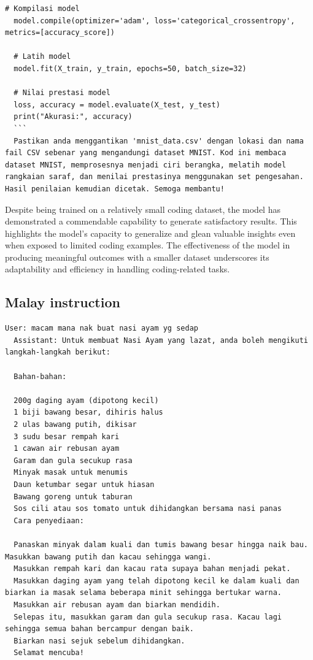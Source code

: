 \documentclass[preprint]{article}
\begin{document}
\begin{lstlisting}[breaklines=true]
  # Kompilasi model
  model.compile(optimizer='adam', loss='categorical_crossentropy', metrics=[accuracy_score])
  
  # Latih model
  model.fit(X_train, y_train, epochs=50, batch_size=32)
  
  # Nilai prestasi model
  loss, accuracy = model.evaluate(X_test, y_test)
  print("Akurasi:", accuracy)
  ```
  Pastikan anda menggantikan 'mnist_data.csv' dengan lokasi dan nama fail CSV sebenar yang mengandungi dataset MNIST. Kod ini membaca dataset MNIST, memprosesnya menjadi ciri berangka, melatih model rangkaian saraf, dan menilai prestasinya menggunakan set pengesahan. Hasil penilaian kemudian dicetak. Semoga membantu!
\end{lstlisting}

Despite being trained on a relatively small coding dataset, the model has demonstrated a commendable capability to generate satisfactory results. This highlights the model's capacity to generalize and glean valuable insights even when exposed to limited coding examples. The effectiveness of the model in producing meaningful outcomes with a smaller dataset underscores its adaptability and efficiency in handling coding-related tasks.

\subsection{Malay instruction}

\begin{lstlisting}[breaklines=true]
  User: macam mana nak buat nasi ayam yg sedap
  Assistant: Untuk membuat Nasi Ayam yang lazat, anda boleh mengikuti langkah-langkah berikut:

  Bahan-bahan:
  
  200g daging ayam (dipotong kecil)
  1 biji bawang besar, dihiris halus
  2 ulas bawang putih, dikisar
  3 sudu besar rempah kari
  1 cawan air rebusan ayam
  Garam dan gula secukup rasa
  Minyak masak untuk menumis
  Daun ketumbar segar untuk hiasan
  Bawang goreng untuk taburan
  Sos cili atau sos tomato untuk dihidangkan bersama nasi panas
  Cara penyediaan:
  
  Panaskan minyak dalam kuali dan tumis bawang besar hingga naik bau. Masukkan bawang putih dan kacau sehingga wangi.
  Masukkan rempah kari dan kacau rata supaya bahan menjadi pekat.
  Masukkan daging ayam yang telah dipotong kecil ke dalam kuali dan biarkan ia masak selama beberapa minit sehingga bertukar warna.
  Masukkan air rebusan ayam dan biarkan mendidih.
  Selepas itu, masukkan garam dan gula secukup rasa. Kacau lagi sehingga semua bahan bercampur dengan baik.
  Biarkan nasi sejuk sebelum dihidangkan.
  Selamat mencuba!
\end{lstlisting}
\end{document}
